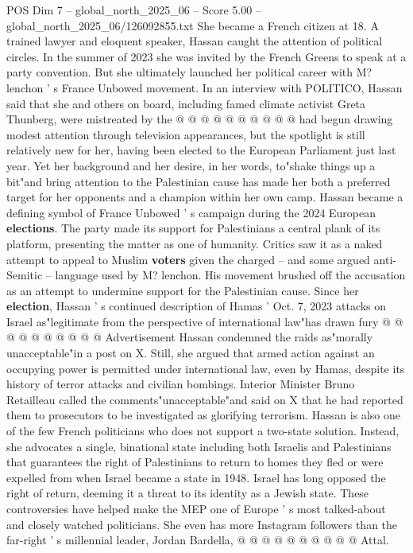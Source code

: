 \begin{textsample}{POS Dim 7 – global\_north\_2025\_06 – Score 5.00 – global\_north\_2025\_06/126092855.txt}
She became a French citizen at 18.
A trained lawyer and eloquent speaker, Hassan caught the attention of political circles.
In the summer of 2023 she was invited by the French Greens to speak at a party convention.
But she ultimately launched her political career with M? lenchon ' s France Unbowed movement.
In an interview with POLITICO, Hassan said that she and others on board, including famed climate activist Greta Thunberg, were mistreated by the @ @ @ @ @ @ @ @ @ @ had begun drawing modest attention through television appearances, but the spotlight is still relatively new for her, having been elected to the European Parliament just last year.
Yet her background and her desire, in her words, to"shake things up a bit"and bring attention to the Palestinian cause has made her both a preferred target for her opponents and a champion within her own camp.
Hassan became a defining symbol of France Unbowed ' s campaign during the 2024 European \textbf{elections}.
The party made its support for Palestinians a central plank of its platform, presenting the matter as one of humanity.
Critics saw it as a naked attempt to appeal to Muslim \textbf{voters} given the charged -- and some argued anti-Semitic -- language used by M? lenchon.
His movement brushed off the accusation as an attempt to undermine support for the Palestinian cause.
Since her \textbf{election}, Hassan ' s continued description of Hamas ' Oct. 7, 2023 attacks on Israel as"legitimate from the perspective of international law"has drawn fury @ @ @ @ @ @ @ @ @ @ Advertisement Hassan condemned the raids as"morally unacceptable"in a post on X.
Still, she argued that armed action against an occupying power is permitted under international law, even by Hamas, despite its history of terror attacks and civilian bombings.
Interior Minister Bruno Retailleau called the comments"unacceptable"and said on X that he had reported them to prosecutors to be investigated as glorifying terrorism.
Hassan is also one of the few French politicians who does not support a two-state solution.
Instead, she advocates a single, binational state including both Israelis and Palestinians that guarantees the right of Palestinians to return to homes they fled or were expelled from when Israel became a state in 1948.
Israel has long opposed the right of return, deeming it a threat to its identity as a Jewish state.
These controversies have helped make the MEP one of Europe ' s most talked-about and closely watched politicians.
She even has more Instagram followers than the far-right ' s millennial leader, Jordan Bardella, @ @ @ @ @ @ @ @ @ @ Attal.

\end{textsample}
